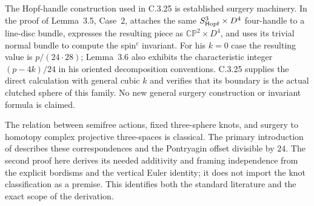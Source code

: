 \begin{remark}
The Hopf-handle construction used in C.3.25 is established
surgery machinery. In the proof of Lemma~3.5, Case~2,
\citet{Jiang2014E} attaches the same
$S^3_{\rm Hopf}\times D^4$ four-handle to a line-disc bundle,
expresses the resulting piece as $\mathbb{CP}^2\times D^4$,
and uses its trivial normal bundle to compute the spin$^c$
invariant. For his $k=0$ case the resulting value is
$p/(24\cdot28)$; Lemma~3.6 also exhibits the characteristic
integer $(p-4k)/24$ in his oriented decomposition conventions.
C.3.25 supplies the direct calculation with general cubic
$k$ and verifies that its boundary is the actual clutched
sphere of this family. No new general surgery construction
or invariant formula is claimed.

The relation between semifree actions, fixed three-sphere
knots, and surgery to homotopy complex projective three-spaces
is classical. The primary introduction of
\citet[pp.~125--126]{MontgomeryYang1968E} describes these
correspondences and the Pontryagin offset divisible by $24$.
The second proof here derives its needed additivity and
framing independence from the explicit bordisms and the
vertical Euler identity; it does not import the knot
classification as a premise. This identifies both the
standard literature and the exact scope of the derivation.
\end{remark}
